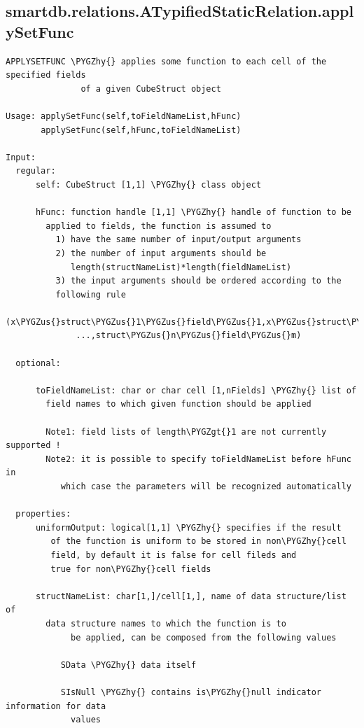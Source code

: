 \documentclass[letterpaper,10pt,english]{sphinxmanual}
\def\PYGZus{\char`\_}
\def\PYGZgt{\char`\>}
\def\PYGZhy{\char`\-}
\begin{document}
\subsection{smartdb.relations.ATypifiedStaticRelation.applySetFunc}
\label{chap_functions:smartdb-relations-atypifiedstaticrelation-applysetfunc}
\begin{Verbatim}[commandchars=\\\{\}]
APPLYSETFUNC \PYGZhy{} applies some function to each cell of the specified fields
               of a given CubeStruct object

Usage: applySetFunc(self,toFieldNameList,hFunc)
       applySetFunc(self,hFunc,toFieldNameList)

Input:
  regular:
      self: CubeStruct [1,1] \PYGZhy{} class object

      hFunc: function handle [1,1] \PYGZhy{} handle of function to be
        applied to fields, the function is assumed to
          1) have the same number of input/output arguments
          2) the number of input arguments should be
             length(structNameList)*length(fieldNameList)
          3) the input arguments should be ordered according to the
          following rule
              (x\PYGZus{}struct\PYGZus{}1\PYGZus{}field\PYGZus{}1,x\PYGZus{}struct\PYGZus{}1\PYGZus{}field\PYGZus{}2,...,struct\PYGZus{}n\PYGZus{}field1,
              ...,struct\PYGZus{}n\PYGZus{}field\PYGZus{}m)

  optional:

      toFieldNameList: char or char cell [1,nFields] \PYGZhy{} list of
        field names to which given function should be applied

        Note1: field lists of length\PYGZgt{}1 are not currently supported !
        Note2: it is possible to specify toFieldNameList before hFunc in
           which case the parameters will be recognized automatically

  properties:
      uniformOutput: logical[1,1] \PYGZhy{} specifies if the result
         of the function is uniform to be stored in non\PYGZhy{}cell
         field, by default it is false for cell fileds and
         true for non\PYGZhy{}cell fields

      structNameList: char[1,]/cell[1,], name of data structure/list of
        data structure names to which the function is to
             be applied, can be composed from the following values

           SData \PYGZhy{} data itself

           SIsNull \PYGZhy{} contains is\PYGZhy{}null indicator information for data
             values


\end{Verbatim}
\end{document}
